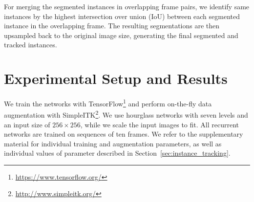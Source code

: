 \documentclass[runningheads,a4paper]{llncs}
\newcommand{\christian}[1]{\textcolor{blue}{[#1]}}
\newcommand{\thomas}[1]{\textcolor{purple}{[#1]}}
\begin{document}
For merging the segmented instances in overlapping frame pairs, we identify same instances by the highest intersection over union (IoU) between each segmented instance in the overlapping frame.
The resulting segmentations are then upsampled back to the original image size, generating the final segmented and tracked instances.

\section{Experimental Setup and Results}
\label{sec:setup}

We train the networks with TensorFlow\footnote{\url{https://www.tensorflow.org/}} and perform on-the-fly data augmentation with SimpleITK\footnote{\url{http://www.simpleitk.org/}}.
We use hourglass networks with seven levels and an input size of $256\times256$, while we scale the input images to fit.
All recurrent networks are trained on sequences of ten frames.
We refer to the supplementary material for individual training and augmentation parameters, as well as individual values of parameter described in Section~\ref{sec:instance_tracking}.
\end{document}

